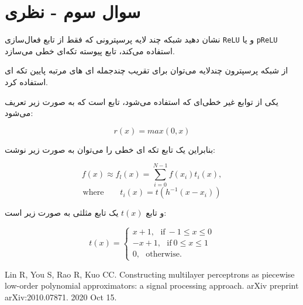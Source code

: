 \section{سوال سوم - نظری}

نشان دهید شبکه چند لایه پرسپترونی که فقط از تابع فعال‌سازی \texttt{ReLU} و یا \texttt{pReLU} استفاده می‌کند، تابع پیوسته تکه‌ای خطی می‌سازد.


\begin{qsolve}
از شبکه پرسپترون چند‌لایه می‌توان برای تقریب چند‌جمله ای های مرتبه پایین تکه ای استفاده کرد. \cite{ref1}

یکی از توابع غیر خطی‌ای که استفاده می‌شود، تابع  است که به صورت زیر تعریف می‌شود:

	$$ r(x)=max(0, x) $$
	
	بنابراین یک تابع تکه ای خطی را می‌توان به صورت زیر نوشت:
	
	$$ f(x)\approx f_l(x)=\sum_{i=0}^{N-1} f(x_i)t_i(x), $$
	$$ \text{where} \qquad t_i(x)=t(h^{-1}(x-x_i)) $$
	
	و تابع $t(x)$ یک تابع مثلثی به صورت زیر است:
	
	$$
	t(x)=
	\begin{cases}
		x+1, \ \ \  \text{if} \ -1\le x \le 0 \\
		-x+1, \ \ \ \text{if} \ 0\le x \le 1 \\
		0,     \ \ \ \text{otherwise.}
	\end{cases}
	$$
	
\end{qsolve}

















\begin{latin}
	\begin{thebibliography}{9}
		Lin R, You S, Rao R, Kuo CC. Constructing multilayer perceptrons as piecewise low-order polynomial approximators: a signal processing approach. arXiv preprint arXiv:2010.07871. 2020 Oct 15.	
	\end{thebibliography} 
\end{latin}










